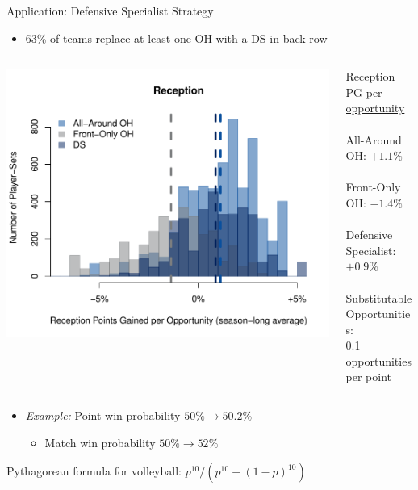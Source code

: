 \documentclass[handout]{beamer}
\begin{document}
\begin{frame}[noframenumbering]{Application: Defensive Specialist Strategy}
  \begin{itemize}
    \item 63\% of teams replace at least one OH with a DS in back row
  \end{itemize}
  \vspace{2mm}
  \begin{columns}
    \begin{column}{0.5\textwidth}
      \centering
      \includegraphics[width = \textwidth]{images/oh_comparison_with_ds.pdf}
    \end{column}
    \begin{column}{0.5\textwidth}
      \small
      \underline{Reception PG per opportunity}\\
      ~\\
      \color{ricerichblue} All-Around OH: $+1.1\%$\\
      ~\\
      \color{ricegray} Front-Only OH: $-1.4\%$\\
      ~\\
      \color{riceblue} Defensive Specialist: $+0.9\%$\\
      ~\\
      \color{black} Substitutable Opportunities:\\
      0.1 opportunities per point
    \end{column}
  \end{columns}
  \vspace{4mm}
  \pause
  \begin{itemize}
    \item {\it Example:} Point win probability $50\% \rightarrow 50.2\%$
    \begin{itemize}
      \item Match win probability $50\% \rightarrow 52\%$
    \end{itemize}
  \end{itemize}
  \vspace{3mm}
  \centering
  \footnotesize
  Pythagorean formula for volleyball: $p^{10} / (p^{10} + (1-p)^{10})$
\end{frame}
\end{document}
